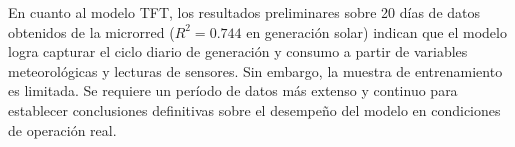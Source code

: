 \documentclass[journal,article,submit,pdftex,moreauthors]{Definitions/mdpi}
\begin{document}
En cuanto al modelo TFT, los resultados preliminares sobre 20 d\'ias de datos obtenidos de la microrred ($R^2 = 0.744$ en generaci\'on solar) indican que el modelo logra capturar el ciclo diario de generaci\'on y consumo a partir de variables meteorol\'ogicas y lecturas de sensores. Sin embargo, la muestra de entrenamiento es limitada. Se requiere un per\'iodo de datos m\'as extenso y continuo para establecer conclusiones definitivas sobre el desempe\~no del modelo en condiciones de operaci\'on real.


\vspace{6pt}
\end{document}
